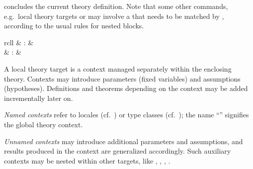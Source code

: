 \begin{isabellebody}
\begin{isamarkuptext}
\begin{description}
  \item \hyperlink{command.global.end}{\mbox{}} concludes the current theory
  definition.  Note that some other commands, e.g.\ local theory
  targets \hyperlink{command.locale}{\mbox{}} or \hyperlink{command.class}{\mbox{}} may involve a
  \hyperlink{keyword.begin}{\mbox{}} that needs to be matched by \hyperlink{command.local.end}{\mbox{}}, according to the usual rules for nested blocks.

  \end{description}%
\end{isamarkuptext}%
\isamarkuptrue%
%
\isamarkuptrue%
%
\begin{isamarkuptext}%
\begin{matharray}{rcll}
    \hypertarget{command.context}{\hyperlink{command.context}{\mbox{}}} & : &  \\
    \hypertarget{command.local.end}{\hyperlink{command.local.end}{\mbox{}}} & : &  \\
  \end{matharray}

  A local theory target is a context managed separately within the
  enclosing theory.  Contexts may introduce parameters (fixed
  variables) and assumptions (hypotheses).  Definitions and theorems
  depending on the context may be added incrementally later on.

  \emph{Named contexts} refer to locales (cf.\ ) or
  type classes (cf.\ ); the name ``''
  signifies the global theory context.

  \emph{Unnamed contexts} may introduce additional parameters and
  assumptions, and results produced in the context are generalized
  accordingly.  Such auxiliary contexts may be nested within other
  targets, like \hyperlink{command.locale}{\mbox{}}, \hyperlink{command.class}{\mbox{}}, \hyperlink{command.instantiation}{\mbox{}}, \hyperlink{command.overloading}{\mbox{}}.


\end{isamarkuptext}
\end{isabellebody}
